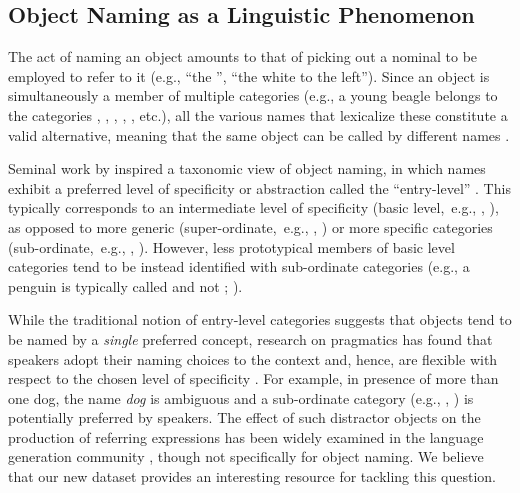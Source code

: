 \subsection{Object Naming as a Linguistic Phenomenon}
\label{subsec:rosch}

The act of naming an object amounts to that of picking out a nominal to be employed to refer to it (e.g., ``the '', ``the white  to the left''). 
Since an object is simultaneously a member of multiple categories (e.g., a young beagle belongs to the categories , , , , , etc.), all the various names that lexicalize these constitute a valid alternative, meaning that the same object can be called by different names \cite{brown1958shall,murphy2004big}.

Seminal work by  inspired a taxonomic view of object naming, in which names exhibit a preferred level of specificity or abstraction called the ``entry-level'' \cite{jolicoeur1984pictures}. 
This typically corresponds to an intermediate level of specificity (basic level,\ e.g., , ), as opposed to more generic (super-ordinate,\ e.g., , ) or more specific categories (sub-ordinate,\ e.g., , ).
However, less prototypical members of basic level categories tend to be instead identified with sub-ordinate categories (e.g., a penguin is typically called  and not ; ). 

While the traditional notion of entry-level categories suggests that objects tend to be named by a \textit{single} preferred concept, research on pragmatics has found that speakers adopt their naming choices to the context and, hence, are flexible with respect to the chosen level of specificity \cite{olson1970language,rohde2012communicating,graf2016animal}.
For example, in presence of more than one dog, the name \textsl{dog} is ambiguous and a sub-ordinate category (e.g., , ) is potentially preferred by speakers. The effect of such distractor objects on the production of referring expressions has been widely examined in the language generation community \cite{krahmer:2012}, though not specifically for object naming. We believe that our new dataset provides an interesting resource for tackling this question.

